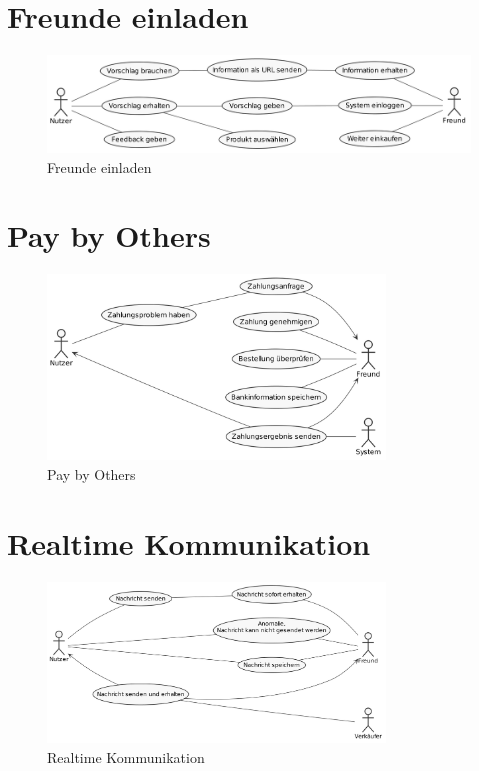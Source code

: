 \section{Freunde einladen}

\begin{figure}[htbp]
	\centering
	\includegraphics[width=1\textwidth]{uml-diagramme/freunde-einladen.png}
	\caption{Freunde einladen}
	\label{fig:freunde-einladen}
\end{figure}


\newpage

\section{Pay by Others}

\begin{figure}[htbp]
	\centering
	\includegraphics[width=0.8\textwidth]{uml-diagramme/pay-by-others.png}
	\caption{Pay by Others}
	\label{fig:pay-by-others}
\end{figure}


\section{Realtime Kommunikation}

\begin{figure}[htbp]
	\centering
	\includegraphics[width=0.8\textwidth]{uml-diagramme/real-time-communication.png}
	\caption{Realtime Kommunikation}
	\label{fig:real-time-communication}
\end{figure}

